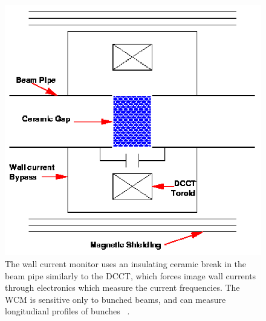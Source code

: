 \begin{figure}
\begin{center}
\includegraphics[width=0.75\linewidth]{./figures/dcct_schematic_cartoon}
\caption{The wall current monitor uses an insulating ceramic break in the beam pipe
similarly to the DCCT, which forces image wall currents through electronics which measure
the current frequencies. The WCM is sensitive only to bunched beams, and can measure
longitudianl profiles of bunches ~\cite{kawallfocus2005}.}
\label{fig:dcct_schematic_cartoon}
\end{center}
\end{figure}

